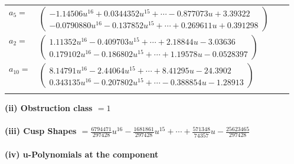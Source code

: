 \documentclass[1p]{elsarticle_modified}
\theoremstyle{definition}
\begin{document}
\begin{tabular}{m{7pt} m{180pt} m{7pt} m{180pt} }
\flushright $a_{5}=$&$\begin{pmatrix}-1.14506 u^{16}+0.0344352 u^{15}+\cdots-0.877073 u+3.39322\\-0.0790880 u^{16}-0.137852 u^{15}+\cdots+0.269611 u+0.391298\end{pmatrix}$ \\
\flushright $a_{2}=$&$\begin{pmatrix}1.11352 u^{16}-0.409703 u^{15}+\cdots+2.18844 u-3.03636\\0.179102 u^{16}-0.186802 u^{15}+\cdots+1.19578 u-0.0528397\end{pmatrix}$ \\
\flushright $a_{10}=$&$\begin{pmatrix}8.14791 u^{16}-2.44064 u^{15}+\cdots+8.41295 u-24.3902\\0.343135 u^{16}-0.207802 u^{15}+\cdots-0.388854 u-1.28913\end{pmatrix}$\\&\end{tabular}
\flushleft \textbf{(ii) Obstruction class $= 1$}\\~\\
\flushleft \textbf{(iii) Cusp Shapes $= \frac{6794471}{297428} u^{16}-\frac{1681861}{297428} u^{15}+\cdots+\frac{571348}{74357} u-\frac{25623465}{297428}$}\\~\\
\newpage\renewcommand{\arraystretch}{1}
\flushleft \textbf{(iv) u-Polynomials at the component}\newline \\
\end{document}
